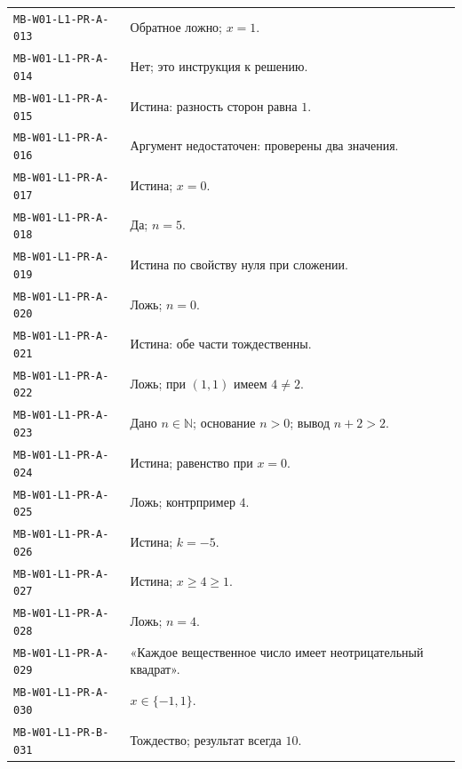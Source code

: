 \documentclass[11pt,a4paper,openany]{book}
\newcommand{\muid}[1]{\texttt{\footnotesize #1}}
\begin{document}
\begin{longtable}{p{}p{}}
\muid{MB-W01-L1-PR-A-013} & Обратное ложно; $x=1$.\\

\muid{MB-W01-L1-PR-A-014} & Нет; это инструкция к решению.\\

\muid{MB-W01-L1-PR-A-015} & Истина: разность сторон равна $1$.\\

\muid{MB-W01-L1-PR-A-016} & Аргумент недостаточен: проверены два значения.\\

\muid{MB-W01-L1-PR-A-017} & Истина; $x=0$.\\

\muid{MB-W01-L1-PR-A-018} & Да; $n=5$.\\

\muid{MB-W01-L1-PR-A-019} & Истина по свойству нуля при сложении.\\

\muid{MB-W01-L1-PR-A-020} & Ложь; $n=0$.\\

\muid{MB-W01-L1-PR-A-021} & Истина: обе части тождественны.\\

\muid{MB-W01-L1-PR-A-022} & Ложь; при $(1,1)$ имеем $4\ne2$.\\

\muid{MB-W01-L1-PR-A-023} & Дано $n\in\mathbb N$; основание $n>0$; вывод $n+2>2$.\\

\muid{MB-W01-L1-PR-A-024} & Истина; равенство при $x=0$.\\

\muid{MB-W01-L1-PR-A-025} & Ложь; контрпример $4$.\\

\muid{MB-W01-L1-PR-A-026} & Истина; $k=-5$.\\

\muid{MB-W01-L1-PR-A-027} & Истина; $x\ge4\ge1$.\\

\muid{MB-W01-L1-PR-A-028} & Ложь; $n=4$.\\

\muid{MB-W01-L1-PR-A-029} & «Каждое вещественное число имеет неотрицательный квадрат».\\

\muid{MB-W01-L1-PR-A-030} & $x\in\{-1,1\}$.\\

\muid{MB-W01-L1-PR-B-031} & Тождество; результат всегда $10$.\\


\end{longtable}
\end{document}
